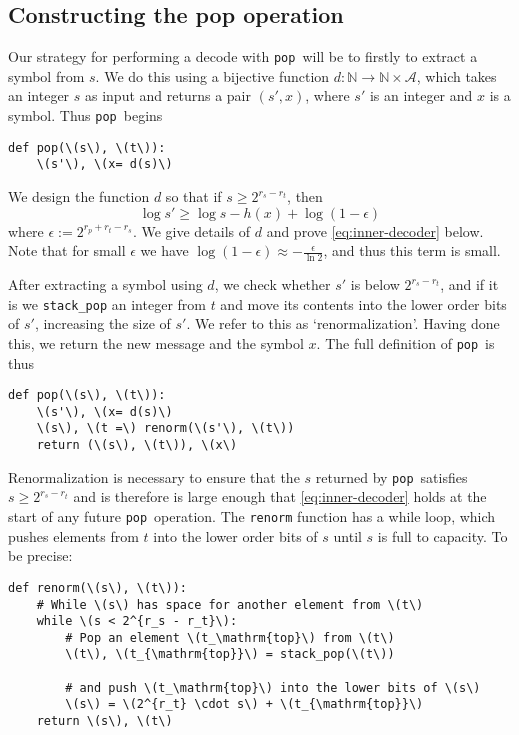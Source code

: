 \documentclass{article}
\newcommand{\pop}{\texttt{pop}}
\begin{document}
\subsection{Constructing the pop operation}
Our strategy for performing a decode with \pop\ will be to firstly to extract a
symbol from \(s\). We do this using a bijective function \(d:\mathbb
N\rightarrow\mathbb N\times\mathcal{A}\), which takes an integer \(s\) as input
and returns a pair \((s', x)\), where \(s'\) is an integer and \(x\) is a
symbol.  Thus \pop\ begins
\begin{lstlisting}
def pop(\(s\), \(t\)):
    \(s'\), \(x= d(s)\)
\end{lstlisting}
We design the function \(d\) so that if \(s\geq 2^{r_s - r_t}\), then
\begin{equation}\label{eq:inner-decoder}
  \log s'\geq\log s - h(x) + \log (1 - \epsilon)
\end{equation}
where \(\epsilon := 2^{r_p + r_t - r_s}\). We give details of \(d\) and prove
\cref{eq:inner-decoder} below. Note that for small \(\epsilon\) we have \(\log
(1 - \epsilon) \approx -\frac{\epsilon}{\ln2}\), and thus this term is small.

After extracting a symbol using \(d\), we check whether \(s'\) is below
\(2^{r_s - r_t}\), and if it is we \texttt{stack\_pop} an integer from \(t\)
and move its contents into the lower order bits of \(s'\), increasing the size
of \(s'\). We refer to this as `renormalization'. Having done this, we return
the new message and the symbol \(x\). The full definition of \pop\ is thus
\begin{lstlisting}
def pop(\(s\), \(t\)):
    \(s'\), \(x= d(s)\)
    \(s\), \(t =\) renorm(\(s'\), \(t\))
    return (\(s\), \(t\)), \(x\)
\end{lstlisting}

Renormalization is necessary to ensure that the \(s\) returned by \pop\
satisfies \(s\geq2^{r_s - r_t}\) and is therefore is large enough that
\cref{eq:inner-decoder} holds at the start of any future \pop\ operation. The
\texttt{renorm} function has a while loop, which pushes elements from \(t\)
into the lower order bits of \(s\) until \(s\) is full to capacity. To be
precise:

\begin{lstlisting}
def renorm(\(s\), \(t\)):
    # While \(s\) has space for another element from \(t\)
    while \(s < 2^{r_s - r_t}\):
        # Pop an element \(t_\mathrm{top}\) from \(t\)
        \(t\), \(t_{\mathrm{top}}\) = stack_pop(\(t\))

        # and push \(t_\mathrm{top}\) into the lower bits of \(s\)
        \(s\) = \(2^{r_t} \cdot s\) + \(t_{\mathrm{top}}\)
    return \(s\), \(t\)
\end{lstlisting}
\end{document}
